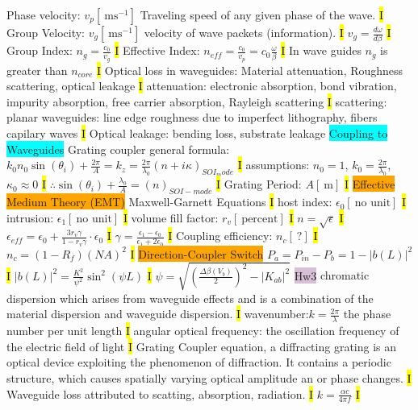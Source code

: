 \documentclass[fontsize=3]{scrartcl}
\begin{document}
Phase velocity: $v_p  [\SI{} {\meter \second^{-1} } ] $ Traveling speed of any given phase of the wave.  
\hl{I}
Group Velocity: $v_g  [\SI{} {\meter \second^{-1} } ] $ velocity of wave packets (information).  
\hl{I}
$v_g = \frac{d\omega}{d\beta}$
\hl{I}
Group Index: $n_g = \frac{c_0}{v_g}$
\hl{I}
Effective Index: $n_{eff} = \frac{c_0}{v_p} = c_0 \frac{\omega}{\beta}$ 
\hl{I}
In wave guides $n_g$ is greater than $n_{core}$
\hl{I}
Optical loss in waveguides: Material attenuation, Roughness scattering, optical leakage
\hl{I}
attenuation: electronic absorption, bond vibration, impurity absorption, free carrier absorption, Rayleigh scattering
\hl{I}
scattering: planar waveguides: line edge roughness due to imperfect lithography, fibers capilary waves
\hl{I}
Optical leakage: bending loss, substrate leakage
\colorbox{Cyan}{Coupling to Waveguides}
Grating coupler general formula: $k_0 n_0 \sin(\theta_i) + \frac{2\pi}{A} = k_z = \frac{2\pi}{\lambda_0} (n + i\kappa)_{SOI_mode}$
\hl{I}
assumptions: $n_0 = 1$, $k_0 = \frac{2 \pi}{\lambda_0}$, $\kappa_0 \approx 0$
\hl{I}
$\therefore \sin(\theta_i) + \frac{\lambda_0}{A} = (n)_{SOI -mode}$
\hl{I}
Grating Period: $A [\SI{} {\meter}] $ 
\hl{I}
\colorbox{Orange}{Effective Medium Theory (EMT)}
Maxwell-Garnett Equations
\hl{I}
host index: $\epsilon_0 [\SI{} {\text{no unit}}] $ 
\hl{I}
intrusion: $\epsilon_1 [\SI{} {\text{no unit}}] $ 
\hl{I}
volume fill factor: $r_v [\SI{} {\text{percent}}] $ 
\hl{I}
$n = \sqrt{\epsilon}$
\hl{I}
$\epsilon_{eff} = \epsilon_0 + \frac{3r_v \gamma}{1-r_v \gamma} \cdot \epsilon_0$
\hl{I}
$\gamma = \frac{\epsilon_1 - \epsilon_0}{\epsilon_1 + 2\epsilon_0}$
\hl{I}
Coupling efficiency: $n_c [\SI{} {\text{?}}] $ 
\hl{I}
$n_c = (1-R_f)(NA)^2$
\hl{I}
\colorbox{Orange}{Direction-Coupler Switch}
$P_a = P_{in} - P_{b} = 1 - |b(L)|^2$
\hl{I}
$|b(L)|^2 = \frac{K^2}{\psi^2}\sin^2 (\psi L)$
\hl{I}
$\psi = \sqrt{(\frac{\Delta \beta (V_b)}{2})^2 - |K_{ab}|^2}$
\colorbox{Thistle}{Hw3}
chromatic dispersion which arises from waveguide effects and is a combination of the material dispersion and waveguide dispersion.
\hl{I}
wavenumber:$k = \frac{2\pi}{\lambda}$ the phase number per unit length
\hl{I}
angular optical frequency: the oscillation frequency of the electric field of light
\hl{I}
Grating Coupler equation, a diffracting grating is an optical device exploiting the phenomenon of diffraction. It contains a periodic structure, which causes spatially varying optical amplitude an or phase changes. 
\hl{I}
Waveguide loss attributed to scatting, absorption, radiation. 
\hl{I}
$k = \frac{\alpha c}{4 \pi f}$
\hl{I}
\end{document}
